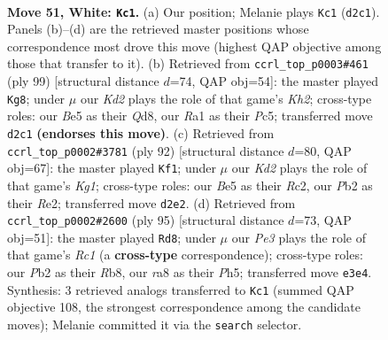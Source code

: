 \documentclass[11pt]{article}
\begin{document}
\clearpage

\begin{figure}[p]\centering
\begin{subfigure}{0.46\textwidth}\centering
\resizebox{\linewidth}{!}{%
\newchessgame
\chessboard[
  setfen={r4b1r/3k2p1/p1p5/Pp1bBp1p/2p2P1P/4P1P1/1P1K3N/R5R1 w - - 3 51},
  showmover=false,
  pgfstyle=straightmove, color=movearrow, markmove={d2-c1}
]}
\caption{}
\end{subfigure}\hfill
\begin{subfigure}{0.46\textwidth}\centering
\resizebox{\linewidth}{!}{%
\newchessgame
\chessboard[
  setfen={3q4/pr4pk/1p1Pp2p/2p1Bp2/2P1bP2/4P2P/P2R2PK/3Q4 b - - 19 50},
  showmover=false,
  pgfstyle=straightmove, color=movearrow, markmove={h7-g8}
]}
\caption{}
\end{subfigure}
\\[4pt]
\begin{subfigure}{0.46\textwidth}\centering
\resizebox{\linewidth}{!}{%
\newchessgame
\chessboard[
  setfen={1k3r2/1npb4/r1pb1p2/p5p1/N2BB2p/1P3P1P/P1R1R1P1/6K1 w - - 43 47},
  showmover=false,
  pgfstyle=straightmove, color=movearrow, markmove={g1-f1}
]}
\caption{}
\end{subfigure}\hfill
\begin{subfigure}{0.46\textwidth}\centering
\resizebox{\linewidth}{!}{%
\newchessgame
\chessboard[
  setfen={1rr5/4k3/1bb1p1p1/p4p1p/2p4P/P1B1PPP1/1P1R1K2/3B3R b - - 3 48},
  showmover=false,
  pgfstyle=straightmove, color=movearrow, markmove={c8-d8}
]}
\caption{}
\end{subfigure}
\caption{\textbf{Move 51, White: \texttt{Kc1}.} (a) Our position; Melanie plays \texttt{Kc1} (\texttt{d2c1}). Panels (b)--(d) are the retrieved master positions whose correspondence most drove this move (highest QAP objective among those that transfer to it). (b) Retrieved from \texttt{ccrl\_top\_p0003\#461} (ply 99) [structural distance $d$=74, QAP obj=54]: the master played \texttt{Kg8}; under $\mu$ our \emph{Kd2} plays the role of that game's \emph{Kh2}; cross-type roles: our \emph{B}e5 as their \emph{Q}d8, our \emph{R}a1 as their \emph{P}c5; transferred move \texttt{d2c1} \textbf{(endorses this move)}. (c) Retrieved from \texttt{ccrl\_top\_p0002\#3781} (ply 92) [structural distance $d$=80, QAP obj=67]: the master played \texttt{Kf1}; under $\mu$ our \emph{Kd2} plays the role of that game's \emph{Kg1}; cross-type roles: our \emph{B}e5 as their \emph{R}c2, our \emph{P}b2 as their \emph{R}e2; transferred move \texttt{d2e2}. (d) Retrieved from \texttt{ccrl\_top\_p0002\#2600} (ply 95) [structural distance $d$=73, QAP obj=51]: the master played \texttt{Rd8}; under $\mu$ our \emph{Pe3} plays the role of that game's \emph{Rc1} (a \textbf{cross-type} correspondence); cross-type roles: our \emph{P}b2 as their \emph{R}b8, our \emph{r}a8 as their \emph{P}h5; transferred move \texttt{e3e4}. Synthesis: 3 retrieved analogs transferred to \texttt{Kc1} (summed QAP objective 108, the strongest correspondence among the candidate moves); Melanie committed it via the \texttt{search} selector.}
\label{fig:thought-m100}
\end{figure}
\end{document}
